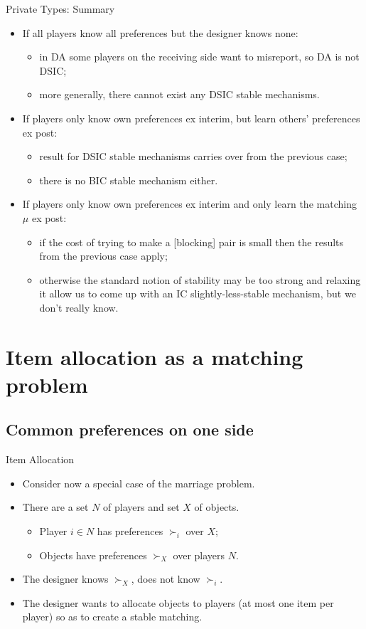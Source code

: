 \documentclass[english,10pt
,aspectratio=169
]{beamer}
\begin{document}
\begin{frame}{Private Types: Summary}
\begin{itemize}
	\item If all players know all preferences but the designer knows none:
	\begin{itemize}
		\item in DA some players on the receiving side want to misreport, so DA is not DSIC;
		\item more generally, there cannot exist any DSIC stable mechanisms.
	\end{itemize}
	\item If players only know own preferences ex interim, but learn others' preferences ex post:
	\begin{itemize}
		\item result for DSIC stable mechanisms carries over from the previous case;
		\item there is no BIC stable mechanism either.
	\end{itemize}
	\item If players only know own preferences ex interim and only learn the matching $\mu$ ex post:
	\begin{itemize}
		\item if the cost of trying to make a [blocking] pair is small then the results from the previous case apply;
		\item otherwise the standard notion of stability may be too strong and relaxing it  allow us to come up with an IC slightly-less-stable mechanism, but we don't really know.
	\end{itemize}
\end{itemize}
\end{frame}


\section{Item allocation as a matching problem}

\subsection{Common preferences on one side}

\begin{frame}{Item Allocation}
\begin{itemize}
	\item Consider now a special case of the marriage problem.
	\item There are a set $N$ of players and set $X$ of objects.
	\begin{itemize}
		\item Player $i\in N$ has preferences $\succ_i$ over $X$;
		\item Objects have  preferences $\succ_X$ over players $N$.
	\end{itemize}
	\item The designer knows $\succ_X$, does not know $\succ_i$.
	\item The designer wants to allocate objects to players (at most one item per player) so as to create a stable matching.
\end{itemize}
\end{frame}
\end{document}
